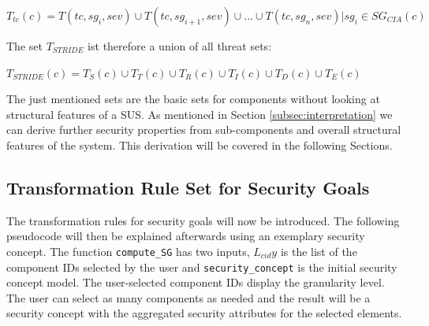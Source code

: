 \begin{theorem} 
$T_{tc}(c) = T(tc, sg_i, sev) \cup T(tc, sg_{i+1}, sev) \cup ... \cup T(tc, sg_n, sev) | sg_i \in SG_{CIA}(c)$
\end{theorem}

The set $T_{STRIDE}$ ist therefore a union of all threat sets:

\begin{theorem} 
$T_{STRIDE}(c) = T_S(c) \cup T_T(c) \cup T_R(c) \cup T_I(c) \cup T_D(c) \cup T_E(c)$
\end{theorem}

The just mentioned sets are the basic sets for components without looking at structural features of a SUS. As mentioned in Section \ref{subsec:interpretation} we can derive further security properties from sub-components and overall structural features of the system. This derivation will be covered in the following Sections.

\subsection{Transformation Rule Set for Security Goals}
\label{subsec:sec_goals_rules}

The transformation rules for security goals will now be introduced. The following pseudocode will then be explained afterwards using an exemplary security concept. The function  \texttt{compute\_SG} has two inputs, $L_{cid}y$ is the list of the component IDs selected by the user and \texttt{security\_concept} is the initial security concept model. The user-selected component IDs display the granularity level. The user can select as many components as needed and the result will be a security concept with the aggregated security attributes for the selected elements.

